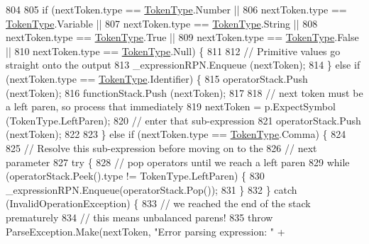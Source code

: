 \begin{DoxyCode}
804 
805                     \textcolor{keywordflow}{if} (nextToken.type == \hyperlink{a00041_a301aa7c866593a5b625a8fc158bbeace}{TokenType}.Number ||
806                         nextToken.type == \hyperlink{a00041_a301aa7c866593a5b625a8fc158bbeace}{TokenType}.Variable ||
807                         nextToken.type == \hyperlink{a00041_a301aa7c866593a5b625a8fc158bbeace}{TokenType}.String ||
808                         nextToken.type == \hyperlink{a00041_a301aa7c866593a5b625a8fc158bbeace}{TokenType}.True ||
809                         nextToken.type == \hyperlink{a00041_a301aa7c866593a5b625a8fc158bbeace}{TokenType}.False ||
810                         nextToken.type == \hyperlink{a00041_a301aa7c866593a5b625a8fc158bbeace}{TokenType}.Null) \{
811 
812                         \textcolor{comment}{// Primitive values go straight onto the output}
813                         \_expressionRPN.Enqueue (nextToken);
814                     \} \textcolor{keywordflow}{else} \textcolor{keywordflow}{if} (nextToken.type == \hyperlink{a00041_a301aa7c866593a5b625a8fc158bbeace}{TokenType}.Identifier) \{
815                         operatorStack.Push (nextToken);
816                         functionStack.Push (nextToken);
817 
818                         \textcolor{comment}{// next token must be a left paren, so process that immediately}
819                         nextToken = p.ExpectSymbol (TokenType.LeftParen);
820                         \textcolor{comment}{// enter that sub-expression}
821                         operatorStack.Push (nextToken);
822 
823                     \} \textcolor{keywordflow}{else} \textcolor{keywordflow}{if} (nextToken.type == \hyperlink{a00041_a301aa7c866593a5b625a8fc158bbeace}{TokenType}.Comma) \{
824 
825                         \textcolor{comment}{// Resolve this sub-expression before moving on to the}
826                         \textcolor{comment}{// next parameter}
827                         \textcolor{keywordflow}{try} \{
828                             \textcolor{comment}{// pop operators until we reach a left paren}
829                             \textcolor{keywordflow}{while} (operatorStack.Peek().type != TokenType.LeftParen) \{
830                                 \_expressionRPN.Enqueue(operatorStack.Pop());
831                             \}
832                         \} \textcolor{keywordflow}{catch} (InvalidOperationException) \{
833                             \textcolor{comment}{// we reached the end of the stack prematurely}
834                             \textcolor{comment}{// this means unbalanced parens!}
835                             \textcolor{keywordflow}{throw} ParseException.Make(nextToken, \textcolor{stringliteral}{"Error parsing expression: "} +

\end{DoxyCode}
